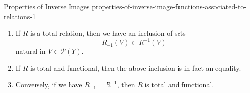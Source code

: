 \begin{proposition}{Properties of Inverse Images \rmI}{properties-of-inverse-image-functions-associated-to-relations-1}
\begin{enumerate}
            \begin{enumerate}
                \item\label{properties-of-inverse-image-functions-associated-to-relations-1-relation-to-coinverse-images-2-a}If $R$ is a total relation, then we have an inclusion of sets
                    \[
                        R_{-1}(V)
                        \subset
                        R^{-1}(V)
                    \]%
                    natural in $V\in\mathcal{P}(Y)$.
                \item\label{properties-of-inverse-image-functions-associated-to-relations-1-relation-to-coinverse-images-2-b}If $R$ is total and functional, then the above inclusion is in fact an equality.
                \item\label{properties-of-inverse-image-functions-associated-to-relations-1-relation-to-coinverse-images-2-c}Conversely, if we have $R_{-1}=R^{-1}$, then $R$ is total and functional.
            \end{enumerate}
    \end{enumerate}
\end{proposition}
